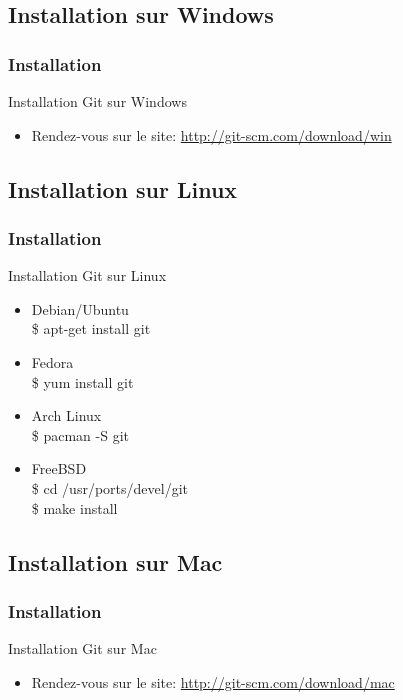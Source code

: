 \documentclass{beamer}
\begin{document}
\subsection{Installation sur Windows}\label{Installation sur Windows}
\begin{frame}
\frametitle{Installation}
\begin{block}{Installation Git sur Windows}
\begin{itemize}
\item Rendez-vous sur le site: \href{http://git-scm.com/download/win}{http://git-scm.com/download/win}
\end{itemize}
\end{block}
\end{frame}

\subsection{Installation sur Linux}\label{Installation sur Linux}
\begin{frame}
\frametitle{Installation}
\begin{block}{Installation Git sur Linux}
\begin{itemize}
\item Debian/Ubuntu \\ \$ apt-get install git
\end{itemize}
\begin{itemize}
\item Fedora  \\ \$ yum install git
\end{itemize}
\begin{itemize}
\item Arch Linux  \\ \$ pacman -S git
\end{itemize}
\begin{itemize}
\item FreeBSD \\ \$ cd /usr/ports/devel/git\\ \$ make install
\end{itemize}

\end{block}
\end{frame}

\subsection{Installation sur Mac}\label{Installation sur Mac}
\begin{frame}
\frametitle{Installation}
\begin{block}{Installation Git sur Mac}
\begin{itemize}
\item Rendez-vous sur le site: \href{http://git-scm.com/download/mac}{http://git-scm.com/download/mac}
\end{itemize}
\end{block}
\end{frame}
\end{document}

